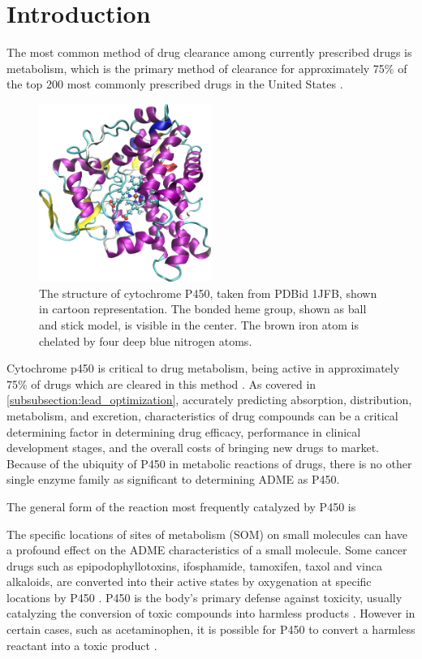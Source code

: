 \section{Introduction}
\label{section:p450/introduction}
The most common method of drug clearance among currently prescribed drugs is metabolism, which is the primary method of clearance for approximately 75\% of the top 200 most commonly prescribed drugs in the United States \cite{williams2004drug}.
\begin{figure}[h]
\centering
\includegraphics[width=0.5\textwidth]{figures/p450.png}
\caption{
The structure of cytochrome P450, taken from PDBid 1JFB, shown in cartoon representation.
The bonded heme group, shown as ball and stick model, is visible in the center.
The brown iron atom is chelated by four deep blue nitrogen atoms. 
}
\label{fig:p450}
\end{figure}
Cytochrome p450 is critical to drug metabolism, being active in approximately 75\% of drugs which are cleared in this method \cite{guengerich2007cytochrome}. 
As covered in \ref{subsubsection:lead_optimization}, accurately predicting  absorption, distribution, metabolism, and excretion, characteristics of drug compounds can be a critical determining factor in determining drug efficacy, performance in clinical development stages, and the overall costs of bringing new drugs to market.
Because of the ubiquity of P450 in metabolic reactions of drugs, there is no other single enzyme family as significant to determining ADME as P450.   

The general form of the reaction most frequently catalyzed by P450 is 


The specific locations of sites of metabolism (SOM) on small molecules can have a profound effect on the ADME characteristics of a small molecule.
Some cancer drugs such as epipodophyllotoxins, ifosphamide, tamoxifen, taxol and vinca alkaloids, are converted into their active states by oxygenation at specific locations by P450 \cite{kivisto1995role}.
P450 is the body's primary defense against toxicity, usually catalyzing the conversion of toxic compounds into harmless products \cite{gonzalez2005role,guengerich2001common}.
However in certain cases, such as acetaminophen, it is possible for P450 to convert a harmless reactant into a toxic product \cite{chen1998oxidation}.


